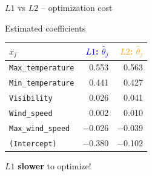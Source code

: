 \documentclass[11pt,compress,t,notes=noshow, xcolor=table]{beamer}
\begin{document}
\begin{vbframe}{$L1$ vs $L2$ -- optimization cost}
\begin{minipage}[c]{0.45\textwidth}
    \vspace{0.5cm}
    
    Estimated coefficients \\
    
    \begin{tabular}{l|r|r}
        $x_j$ & \textcolor{blue}{$L1$: $\hat \theta_j$}  &
        \textcolor{orange}{$L2$: $\hat \theta_j$} \\ \hline
        \texttt{Max\_temperature} & 0.553 & 0.563 \\
        \texttt{Min\_temperature} & 0.441 & 0.427 \\
        \texttt{Visibility} & 0.026 & 0.041 \\
        \texttt{Wind\_speed} & 0.002 & 0.010 \\
        \texttt{Max\_wind\_speed} & $-$0.026 & $-$0.039 \\
        \texttt{(Intercept)} & $-$0.380 & $-$0.102 \\
    \end{tabular}
    
    \vspace{0.5cm}
    \normalsize
    $L1$ \textbf{slower} to optimize!
\end{minipage}

\end{vbframe}





\end{document}
